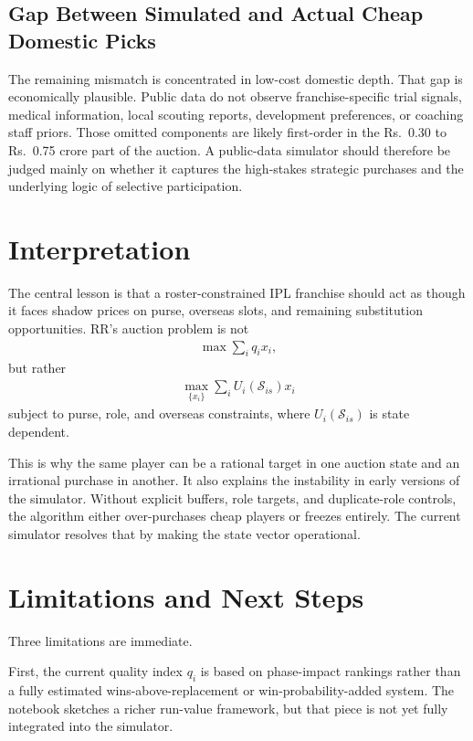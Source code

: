 \documentclass[11pt]{article}
\begin{document}
\subsection{Gap Between Simulated and Actual Cheap Domestic Picks}

The remaining mismatch is concentrated in low-cost domestic depth. That gap is economically plausible. Public data do not observe franchise-specific trial signals, medical information, local scouting reports, development preferences, or coaching staff priors. Those omitted components are likely first-order in the Rs.\ 0.30 to Rs.\ 0.75 crore part of the auction. A public-data simulator should therefore be judged mainly on whether it captures the high-stakes strategic purchases and the underlying logic of selective participation.

\section{Interpretation}

The central lesson is that a roster-constrained IPL franchise should act as though it faces shadow prices on purse, overseas slots, and remaining substitution opportunities. RR's auction problem is not
\begin{align}
\max \sum_i q_i x_i,
\end{align}
but rather
\begin{align}
\max_{\{x_i\}} \sum_i U_i(\mathcal{S}_{is})x_i
\end{align}
subject to purse, role, and overseas constraints, where \(U_i(\mathcal{S}_{is})\) is state dependent.

This is why the same player can be a rational target in one auction state and an irrational purchase in another. It also explains the instability in early versions of the simulator. Without explicit buffers, role targets, and duplicate-role controls, the algorithm either over-purchases cheap players or freezes entirely. The current simulator resolves that by making the state vector operational.

\section{Limitations and Next Steps}

Three limitations are immediate.

First, the current quality index \(q_i\) is based on phase-impact rankings rather than a fully estimated wins-above-replacement or win-probability-added system. The notebook sketches a richer run-value framework, but that piece is not yet fully integrated into the simulator.
\end{document}
